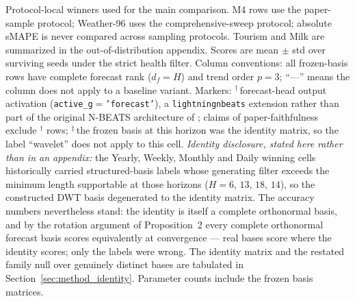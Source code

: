 
\begin{table}[t]
  \caption{Protocol-local winners used for the main comparison. M4 rows
  use the paper-sample protocol; Weather-96 uses the comprehensive-sweep
  protocol; absolute sMAPE is never compared across sampling protocols.
  Tourism and Milk are summarized in the out-of-distribution appendix.
  Scores are mean $\pm$ std over surviving seeds under the strict health
  filter. Column conventions: all frozen-basis rows have complete forecast
  rank ($d_f = H$) and trend order $p = 3$; ``---'' means the column does
  not apply to a baseline variant. Markers: $^{\dag}$\,forecast-head
  output activation (\texttt{active\_g}$=$\texttt{'forecast'}), a
  \texttt{lightningnbeats} extension rather than part of the original
  N-BEATS architecture of \citet{oreshkin2020nbeats}; claims of
  paper-faithfulness exclude $^{\dag}$ rows;
  $^{\ddag}$\,the frozen basis at this horizon was the identity matrix,
  so the label ``wavelet'' does not apply to this cell.
  \emph{Identity disclosure, stated here rather than in an appendix:} the
  Yearly, Weekly, Monthly and Daily winning cells historically carried
  structured-basis labels whose generating filter exceeds the minimum
  length supportable at those horizons ($H = 6$, $13$, $18$, $14$), so the
  constructed DWT basis degenerated to the identity matrix. The accuracy
  numbers nevertheless stand: the identity is itself a complete
  orthonormal basis, and by the rotation argument of Proposition~2 every
  complete orthonormal forecast basis scores equivalently at convergence
  --- real bases score where the identity scores; only the labels were
  wrong. The identity matrix and the restated family null over genuinely
  distinct bases are tabulated in Section~\ref{sec:method_identity}.
  Parameter counts include the frozen basis matrices.}
  \label{tab:main_leaderboard}
  \centering
  \scriptsize

\end{table}
